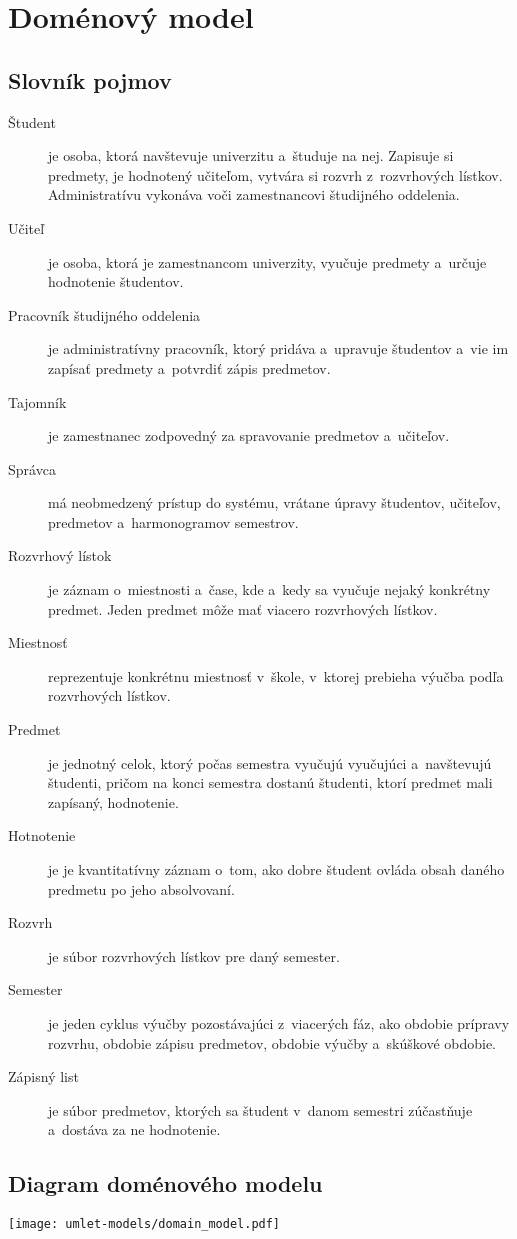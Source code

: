 \section{Doménový model}

\subsection{Slovník pojmov}

\begin{description}
    \item[Študent] je osoba, ktorá navštevuje univerzitu a~študuje na nej.
    Zapisuje si predmety, je hodnotený učiteľom, vytvára si rozvrh
    z~rozvrhových lístkov. Administratívu vykonáva voči zamestnancovi
    študijného oddelenia.

    \item[Učiteľ] je osoba, ktorá je zamestnancom univerzity, vyučuje
    predmety a~určuje hodnotenie študentov.

    \item[Pracovník študijného oddelenia] je administratívny pracovník,
    ktorý pridáva a~upravuje študentov a~vie im zapísať predmety
    a~potvrdiť zápis predmetov.

    \item[Tajomník] je zamestnanec zodpovedný za spravovanie predmetov
    a~učiteľov.

    \item[Správca] má neobmedzený prístup do systému, vrátane úpravy
    študentov, učiteľov, predmetov a~harmonogramov semestrov.

    \item[Rozvrhový lístok] je záznam o~miestnosti a~čase, kde a~kedy sa
    vyučuje nejaký konkrétny predmet. Jeden predmet môže mať viacero
    rozvrhových lístkov.

    \item[Miestnosť] reprezentuje konkrétnu miestnosť v~škole, v~ktorej
    prebieha výučba podľa rozvrhových lístkov.

    \item[Predmet] je jednotný celok, ktorý počas semestra vyučujú
    vyučujúci a~navštevujú študenti, pričom na konci semestra dostanú
    študenti, ktorí predmet mali zapísaný, hodnotenie.

    \item[Hotnotenie] je je kvantitatívny záznam o~tom, ako dobre študent
    ovláda obsah daného predmetu po jeho absolvovaní.

    \item[Rozvrh] je súbor rozvrhových lístkov pre daný semester.

    \item[Semester] je jeden cyklus výučby pozostávajúci z~viacerých fáz,
    ako obdobie prípravy rozvrhu, obdobie zápisu predmetov, obdobie výučby
    a~skúškové obdobie.

    \item[Zápisný list] je súbor predmetov, ktorých sa študent v~danom
    semestri zúčastňuje a~dostáva za ne hodnotenie.
\end{description}

\subsection{Diagram doménového modelu}

\texttt{[image: umlet-models/domain\_model.pdf]}
